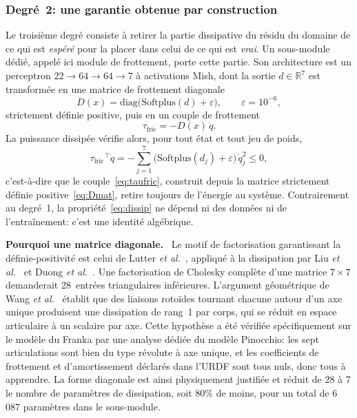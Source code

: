 \documentclass[a4paper, oneside]{article}
\newcommand{\parag}[1]{%
    \par\medskip\noindent\textbf{#1}\ \ignorespaces%
}
\newcommand{\qd}{\ensuremath{\dot{q}}}
\newcommand{\taufric}{\ensuremath{\tau_{\mathrm{fric}}}}
\newcommand{\Rset}{\ensuremath{\mathbb{R}}}
\begin{document}
\subsubsection{Degré~2: une garantie obtenue par construction}
\label{sec:frictionnet}

Le troisième degré consiste à retirer la partie dissipative du résidu du domaine
de ce qui est \emph{espéré} pour la placer dans celui de ce qui est \emph{vrai}.
Un sous-module dédié, appelé ici module de frottement, porte cette partie. Son
architecture est un perceptron $22 \rightarrow 64 \rightarrow 64 \rightarrow 7$
à activations Mish, dont la sortie $d \in \Rset^{7}$ est transformée en une
matrice de frottement diagonale
%
\begin{equation}
    D(x) = \mathrm{diag}\bigl(\mathrm{Softplus}(d) + \varepsilon\bigr),
    \qquad \varepsilon = 10^{-6},
    \label{eq:Dmat}
\end{equation}
%
strictement définie positive, puis en un couple de frottement
%
\begin{equation}
    \taufric = -D(x)\,\qd .
    \label{eq:taufric}
\end{equation}
%
La puissance dissipée vérifie alors, pour tout état et tout jeu de poids,
%
\begin{equation}
    \taufric^{\top}\qd
    = -\sum_{j=1}^{7}\bigl(\mathrm{Softplus}(d_j)+\varepsilon\bigr)\,\qd_j^{2}
    \le 0 ,
    \label{eq:dissip}
\end{equation}
%
c'est-à-dire que le couple~\eqref{eq:taufric}, construit depuis la matrice
strictement définie positive~\eqref{eq:Dmat}, retire toujours de l'énergie au
système. Contrairement au degré~1, la propriété~\eqref{eq:dissip} ne dépend ni
des données ni de l'entraînement: c'est une identité algébrique.

\parag{Pourquoi une matrice diagonale.} Le motif de factorisation
garantissant la définie-positivité est celui de
Lutter \emph{et al.}~\cite{lutter2019iclr}, appliqué à la dissipation par
Liu \emph{et al.}~\cite{liu2024} et Duong \emph{et al.}~\cite{duong2024}. Une
factorisation de Cholesky complète d'une matrice $7\times 7$ demanderait
28~entrées triangulaires inférieures. L'argument géométrique de
Wang \emph{et al.}~\cite{wang2025spel} établit que des liaisons rotoïdes
tournant chacune autour d'un axe unique produisent une dissipation de rang~1 par
corps, qui se réduit en espace articulaire à un scalaire par axe. Cette
hypothèse a été vérifiée spécifiquement sur le modèle du Franka par une analyse
dédiée du modèle Pinocchio: les sept articulations sont bien du type révolute à
axe unique, et les coefficients de frottement et d'amortissement déclarés dans
l'URDF sont tous nuls, donc tous à apprendre. La forme diagonale est ainsi
physiquement justifiée et réduit de 28 à 7 le nombre de paramètres de
dissipation, soit 80\% de moins, pour un total de 6\,087 paramètres dans le
sous-module.
\end{document}
